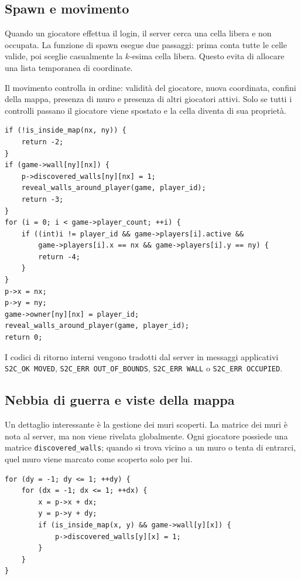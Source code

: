 \documentclass[11pt,a4paper]{article}
\begin{document}
\subsection{Spawn e movimento}

Quando un giocatore effettua il login, il server cerca una cella libera e non occupata. La funzione di spawn esegue due passaggi: prima conta tutte le celle valide, poi sceglie casualmente la \(k\)-esima cella libera. Questo evita di allocare una lista temporanea di coordinate.

Il movimento controlla in ordine: validità del giocatore, nuova coordinata, confini della mappa, presenza di muro e presenza di altri giocatori attivi. Solo se tutti i controlli passano il giocatore viene spostato e la cella diventa di sua proprietà.

\begin{lstlisting}[caption={Regole principali del movimento, tratte da \texttt{game.c}.}]
if (!is_inside_map(nx, ny)) {
    return -2;
}
if (game->wall[ny][nx]) {
    p->discovered_walls[ny][nx] = 1;
    reveal_walls_around_player(game, player_id);
    return -3;
}
for (i = 0; i < game->player_count; ++i) {
    if ((int)i != player_id && game->players[i].active &&
        game->players[i].x == nx && game->players[i].y == ny) {
        return -4;
    }
}
p->x = nx;
p->y = ny;
game->owner[ny][nx] = player_id;
reveal_walls_around_player(game, player_id);
return 0;
\end{lstlisting}

I codici di ritorno interni vengono tradotti dal server in messaggi applicativi \texttt{S2C\_OK MOVED}, \texttt{S2C\_ERR OUT\_OF\_BOUNDS}, \texttt{S2C\_ERR WALL} o \texttt{S2C\_ERR OCCUPIED}.

\subsection{Nebbia di guerra e viste della mappa}

Un dettaglio interessante è la gestione dei muri scoperti. La matrice dei muri è nota al server, ma non viene rivelata globalmente. Ogni giocatore possiede una matrice \texttt{discovered\_walls}; quando si trova vicino a un muro o tenta di entrarci, quel muro viene marcato come scoperto solo per lui.

\begin{lstlisting}[caption={Rivelazione locale dei muri, tratta da \texttt{game.c}.}]
for (dy = -1; dy <= 1; ++dy) {
    for (dx = -1; dx <= 1; ++dx) {
        x = p->x + dx;
        y = p->y + dy;
        if (is_inside_map(x, y) && game->wall[y][x]) {
            p->discovered_walls[y][x] = 1;
        }
    }
}
\end{lstlisting}
\end{document}
